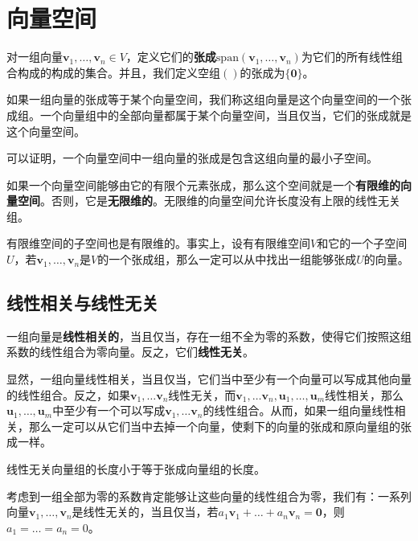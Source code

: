 \hypertarget{sec:vector-space}{%
\section{向量空间}\label{sec:vector-space}}

对一组向量$\boldsymbol{v}_1, \ldots, \boldsymbol{v}_n \in V$，定义它们的\textbf{张成}$\mathrm{span}(\boldsymbol{v}_1, \ldots, \boldsymbol{v}_n)$为它们的所有线性组合构成的构成的集合。并且，我们定义空组$()$的张成为$\{\boldsymbol{0}\}$。

如果一组向量的张成等于某个向量空间，我们称这组向量是这个向量空间的一个张成组。一个向量组中的全部向量都属于某个向量空间，当且仅当，它们的张成就是这个向量空间。

可以证明，一个向量空间中一组向量的张成是包含这组向量的最小子空间。

如果一个向量空间能够由它的有限个元素张成，那么这个空间就是一个\textbf{有限维的向量空间}。否则，它是\textbf{无限维的}。无限维的向量空间允许长度没有上限的线性无关组。

有限维空间的子空间也是有限维的。事实上，设有有限维空间$V$和它的一个子空间$U$，若$\boldsymbol{v}_1, \ldots, \boldsymbol{v}_n$是$V$的一个张成组，那么一定可以从中找出一组能够张成$U$的向量。

\hypertarget{ux7ebfux6027ux76f8ux5173ux4e0eux7ebfux6027ux65e0ux5173}{%
\subsection{线性相关与线性无关}\label{ux7ebfux6027ux76f8ux5173ux4e0eux7ebfux6027ux65e0ux5173}}

一组向量是\textbf{线性相关的}，当且仅当，存在一组不全为零的系数，使得它们按照这组系数的线性组合为零向量。反之，它们\textbf{线性无关}。

显然，一组向量线性相关，当且仅当，它们当中至少有一个向量可以写成其他向量的线性组合。反之，如果$\boldsymbol{v}_1, \ldots \boldsymbol{v}_n$线性无关，而$\boldsymbol{v}_1, \ldots \boldsymbol{v}_n, \boldsymbol{u}_1, \ldots, \boldsymbol{u}_m$线性相关，那么$\boldsymbol{u}_1, \ldots, \boldsymbol{u}_m$中至少有一个可以写成$\boldsymbol{v}_1, \ldots \boldsymbol{v}_n$的线性组合。从而，如果一组向量线性相关，那么一定可以从它们当中去掉一个向量，使剩下的向量的张成和原向量组的张成一样。

线性无关向量组的长度小于等于张成向量组的长度。

考虑到一组全部为零的系数肯定能够让这些向量的线性组合为零，我们有：一系列向量$\boldsymbol{v}_1, \ldots, \boldsymbol{v}_n$是线性无关的，当且仅当，若$a_1 \boldsymbol{v}_1 + \ldots + a_n \boldsymbol{v}_n = \boldsymbol{0}$，则$a_1 = \ldots = a_n=0$。

